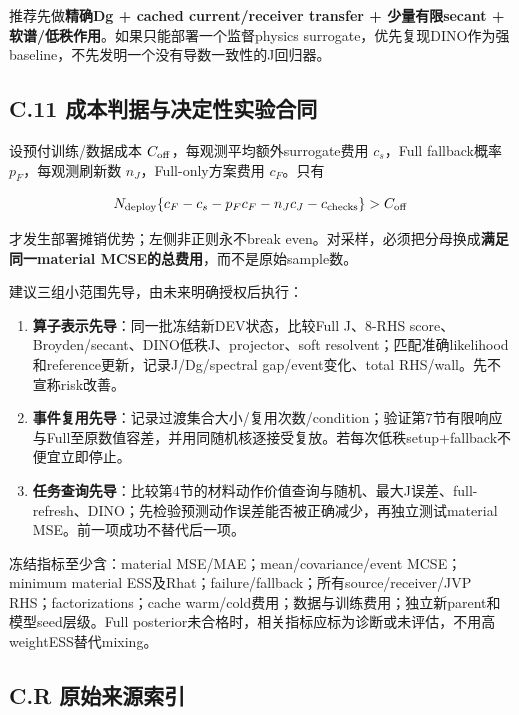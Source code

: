 \documentclass[
  11pt,
  a4paper,
]{article}
\providecommand{\tightlist}{%
  \setlength{\itemsep}{0pt}\setlength{\parskip}{0pt}}
\begin{document}
推荐先做\textbf{精确Dg + cached current/receiver transfer +
少量有限secant + 软谱/低秩作用}。如果只能部署一个监督physics
surrogate，优先复现DINO作为强baseline，不先发明一个没有导数一致性的J回归器。

\hypertarget{c.11-ux6210ux672cux5224ux636eux4e0eux51b3ux5b9aux6027ux5b9eux9a8cux5408ux540c}{%
\subsection{C.11
成本判据与决定性实验合同}\label{c.11-ux6210ux672cux5224ux636eux4e0eux51b3ux5b9aux6027ux5b9eux9a8cux5408ux540c}}

设预付训练/数据成本 \(C_{\rm off}\)，每观测平均额外surrogate费用
\(c_s\)，Full fallback概率 \(p_F\)，每观测刷新数
\(n_J\)，Full-only方案费用 \(c_F\)。只有

\[
N_{\rm deploy}\{c_F-c_s-p_F c_F-n_Jc_J-c_{\rm checks}\}>C_{\rm off}
\]

才发生部署摊销优势；左侧非正则永不break
even。对采样，必须把分母换成\textbf{满足同一material
MCSE的总费用}，而不是原始sample数。

建议三组小范围先导，由未来明确授权后执行：

\begin{enumerate}
\def\labelenumi{\arabic{enumi}.}
\tightlist
\item
  \textbf{算子表示先导}：同一批冻结新DEV状态，比较Full J、8-RHS
  score、Broyden/secant、DINO低秩J、projector、soft
  resolvent；匹配准确likelihood和reference更新，记录J/Dg/spectral
  gap/event变化、total RHS/wall。先不宣称risk改善。
\item
  \textbf{事件复用先导}：记录过渡集合大小/复用次数/condition；验证第7节有限响应与Full至原数值容差，并用同随机核逐接受复放。若每次低秩setup+fallback不便宜立即停止。
\item
  \textbf{任务查询先导}：比较第4节的材料动作价值查询与随机、最大J误差、full-refresh、DINO；先检验预测动作误差能否被正确减少，再独立测试material
  MSE。前一项成功不替代后一项。
\end{enumerate}

冻结指标至少含：material MSE/MAE；mean/covariance/event MCSE；minimum
material ESS及Rhat；failure/fallback；所有source/receiver/JVP
RHS；factorizations；cache
warm/cold费用；数据与训练费用；独立新parent和模型seed层级。Full
posterior未合格时，相关指标应标为诊断或未评估，不用高weightESS替代mixing。

\hypertarget{c.r-ux539fux59cbux6765ux6e90ux7d22ux5f15}{%
\subsection{C.R
原始来源索引}\label{c.r-ux539fux59cbux6765ux6e90ux7d22ux5f15}}
\end{document}
